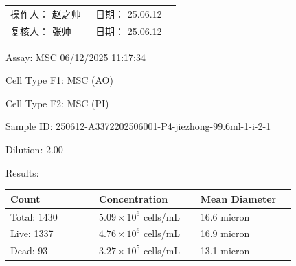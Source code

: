 \documentclass[UTF8,10pt,a4paper,fontset=fandol]{ctexart}
\newcommand{\fieldvalue}[1]{#1}
\newcommand{\handwritten}[1]{#1}
\begin{document}
\vfill

\noindent
\begin{tabular}{@{}p{0.47\linewidth}p{0.47\linewidth}@{}}
操作人：
\fieldvalue{\handwritten{赵之帅}}
&
日期：
\fieldvalue{\handwritten{25.06.12}}
\\[10pt]
复核人：
\fieldvalue{\handwritten{张帅}}
&
日期：
\fieldvalue{\handwritten{25.06.12}}
\end{tabular}

\newpage

\noindent
Assay:
\fieldvalue{MSC}
\hfill
\fieldvalue{06/12/2025 11:17:34}

\medskip

Cell Type F1:
\fieldvalue{MSC (AO)}

Cell Type F2:
\fieldvalue{MSC (PI)}

\medskip

Sample ID:
\fieldvalue{250612-A3372202506001-P4-jiezhong-99.6ml-1-i-2-1}

Dilution:
\fieldvalue{2.00}

\bigskip
\noindent Results:

\medskip

\begin{tabular}{@{}p{0.28\linewidth}p{0.32\linewidth}p{0.30\linewidth}@{}}
\textbf{Count} & \textbf{Concentration} & \textbf{Mean Diameter} \\
\hline
Total:
\fieldvalue{1430}
&
\fieldvalue{$5.09\times10^{6}$ cells/mL}
&
\fieldvalue{16.6 micron}
\\
Live:
\fieldvalue{1337}
&
\fieldvalue{$4.76\times10^{6}$ cells/mL}
&
\fieldvalue{16.9 micron}
\\
Dead:
\fieldvalue{93}
&
\fieldvalue{$3.27\times10^{5}$ cells/mL}
&
\fieldvalue{13.1 micron}
\end{tabular}
\end{document}
